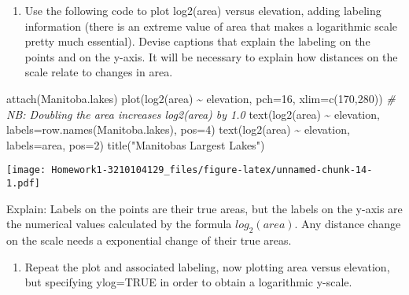 \documentclass[
]{article}
\newenvironment{Shaded}{\begin{snugshade}}{\end{snugshade}}
\newcommand{\AttributeTok}[1]{\textcolor[rgb]{0.77,0.63,0.00}{#1}}
\newcommand{\CommentTok}[1]{\textcolor[rgb]{0.56,0.35,0.01}{\textit{#1}}}
\newcommand{\DecValTok}[1]{\textcolor[rgb]{0.00,0.00,0.81}{#1}}
\newcommand{\FunctionTok}[1]{\textcolor[rgb]{0.00,0.00,0.00}{#1}}
\newcommand{\NormalTok}[1]{#1}
\newcommand{\SpecialCharTok}[1]{\textcolor[rgb]{0.00,0.00,0.00}{#1}}
\newcommand{\StringTok}[1]{\textcolor[rgb]{0.31,0.60,0.02}{#1}}
\providecommand{\tightlist}{%
  \setlength{\itemsep}{0pt}\setlength{\parskip}{0pt}}
\begin{document}
\begin{enumerate}
\def\labelenumi{(\alph{enumi})}
\tightlist
\item
  Use the following code to plot log2(area) versus elevation, adding
  labeling information (there is an extreme value of area that makes a
  logarithmic scale pretty much essential). Devise captions that explain
  the labeling on the points and on the y-axis. It will be necessary to
  explain how distances on the scale relate to changes in area.
\end{enumerate}

\begin{Shaded}
\begin{Highlighting}[]
\FunctionTok{attach}\NormalTok{(Manitoba.lakes)}
\FunctionTok{plot}\NormalTok{(}\FunctionTok{log2}\NormalTok{(area) }\SpecialCharTok{\textasciitilde{}}\NormalTok{ elevation, }\AttributeTok{pch=}\DecValTok{16}\NormalTok{, }\AttributeTok{xlim=}\FunctionTok{c}\NormalTok{(}\DecValTok{170}\NormalTok{,}\DecValTok{280}\NormalTok{))}
\CommentTok{\# NB: Doubling the area increases log2(area) by 1.0}
\FunctionTok{text}\NormalTok{(}\FunctionTok{log2}\NormalTok{(area) }\SpecialCharTok{\textasciitilde{}}\NormalTok{ elevation, }\AttributeTok{labels=}\FunctionTok{row.names}\NormalTok{(Manitoba.lakes), }\AttributeTok{pos=}\DecValTok{4}\NormalTok{)}
\FunctionTok{text}\NormalTok{(}\FunctionTok{log2}\NormalTok{(area) }\SpecialCharTok{\textasciitilde{}}\NormalTok{ elevation, }\AttributeTok{labels=}\NormalTok{area, }\AttributeTok{pos=}\DecValTok{2}\NormalTok{)}
\FunctionTok{title}\NormalTok{(}\StringTok{"Manitoba\textquotesingle{}s Largest Lakes"}\NormalTok{)}
\end{Highlighting}
\end{Shaded}

\texttt{[image: Homework1-3210104129\_files/figure-latex/unnamed-chunk-14-1.pdf]}

Explain: Labels on the points are their true areas, but the labels on
the y-axis are the numerical values calculated by the formula
\(log_2(area)\). Any distance change on the scale needs a exponential
change of their true areas.

\begin{enumerate}
\def\labelenumi{(\alph{enumi})}
\setcounter{enumi}{1}
\tightlist
\item
  Repeat the plot and associated labeling, now plotting area versus
  elevation, but specifying ylog=TRUE in order to obtain a logarithmic
  y-scale.
\end{enumerate}
\end{document}
